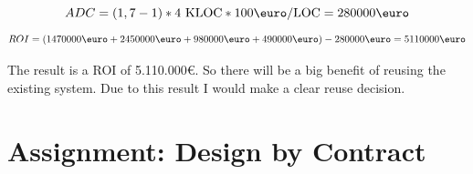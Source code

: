 \documentclass[a4paper,12pt,oneside]{scrreprt}
\begin{document}
\begin{equation*}
	ADC =  (1,7 - 1) * 4\text{ KLOC} * 100 \text{\euro/LOC} = 280000\text{\euro}
\end{equation*}
\begin{equation*}
	ROI = (1470000\text{\euro} + 2450000\text{\euro} + 980000\text{\euro} + 490000\text{\euro}) - 280000\text{\euro} = 5110000\text{\euro}
\end{equation*}

The result is a ROI of 5.110.000\euro. So there will be a big benefit of reusing the existing system. Due to this result I would make a clear reuse decision.


\section{Assignment: Design by Contract}
\end{document}
